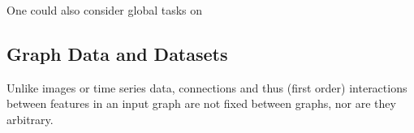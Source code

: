 \documentclass[../main.tex]{subfiles}
\begin{document}
    One could also consider global tasks on

    \subsection{Graph Data and Datasets}\label{subsec:graph-datasets}
    Unlike images or time series data, connections and thus (first order) interactions between features in an input graph are not fixed between graphs, nor are they arbitrary.
\end{document}
